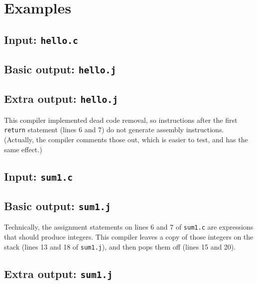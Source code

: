 \documentclass{article}
\begin{document}
\section{Examples} \label{SEC:examples}

\subsection{Input: {\tt hello.c}}



\subsection{Basic output: {\tt hello.j}}



\subsection{Extra output: {\tt hello.j}}

This compiler implemented dead code removal,
so instructions after the first {\tt return} statement
(lines 6 and 7)
do not generate assembly instructions.
(Actually, the compiler comments those out,
which is easier to test, and has the same effect.)



\subsection{Input: {\tt sum1.c}}



\subsection{Basic output: {\tt sum1.j}}

Technically, the assignment statements on lines 6 and 7 of {\tt sum1.c}
are expressions that should produce integers.
This compiler leaves a copy of those integers on the stack
(lines 13 and 18 of {\tt sum1.j}),
and then pops them off
(lines 15 and 20).




\subsection{Extra output: {\tt sum1.j}}
\end{document}
